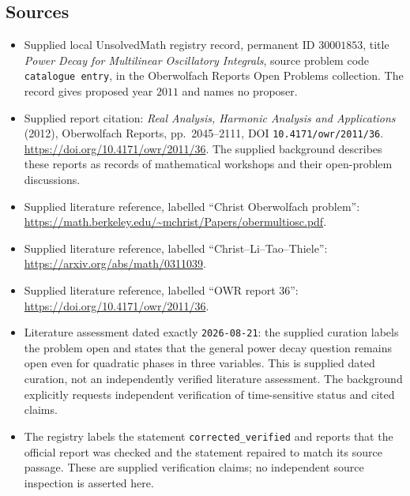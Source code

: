 \documentclass[11pt]{article}
\begin{document}
\subsection{Sources}
\begin{itemize}
\item Supplied local UnsolvedMath registry record, permanent ID \(30001853\), title \emph{Power Decay for Multilinear Oscillatory Integrals}, source problem code \texttt{catalogue entry}, in the Oberwolfach Reports Open Problems collection. The record gives proposed year \(2011\) and names no proposer.
\item Supplied report citation: \emph{Real Analysis, Harmonic Analysis and Applications} (2012), Oberwolfach Reports, pp.\ 2045--2111, DOI \texttt{10.4171/owr/2011/36}. \url{https://doi.org/10.4171/owr/2011/36}. The supplied background describes these reports as records of mathematical workshops and their open-problem discussions.
\item Supplied literature reference, labelled ``Christ Oberwolfach problem'': \url{https://math.berkeley.edu/~mchrist/Papers/obermultiosc.pdf}.
\item Supplied literature reference, labelled ``Christ--Li--Tao--Thiele'': \url{https://arxiv.org/abs/math/0311039}.
\item Supplied literature reference, labelled ``OWR report 36'': \url{https://doi.org/10.4171/owr/2011/36}.
\item Literature assessment dated exactly \texttt{2026-08-21}: the supplied curation labels the problem open and states that the general power decay question remains open even for quadratic phases in three variables. This is supplied dated curation, not an independently verified literature assessment. The background explicitly requests independent verification of time-sensitive status and cited claims.
\item The registry labels the statement \texttt{corrected\_verified} and reports that the official report was checked and the statement repaired to match its source passage. These are supplied verification claims; no independent source inspection is asserted here.
\end{itemize}
\end{document}

